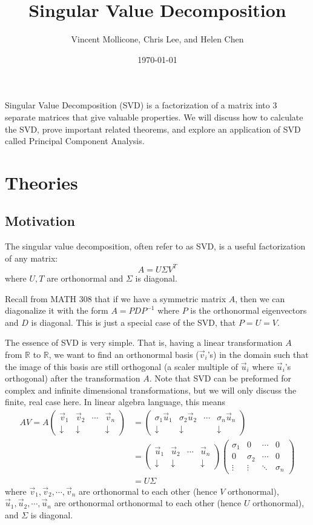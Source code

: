 \documentclass{article}
\title{Singular Value Decomposition}
\author{Vincent Mollicone, Chris Lee, and Helen Chen}
\date{\today}
\begin{document}
\maketitle
Singular Value Decomposition (SVD) is a factorization of a matrix into 3 separate matrices that give valuable properties. We will discuss how to calculate the SVD, prove important related theorems, and explore an application of SVD called Principal Component Analysis.
\tableofcontents
\newpage

\section{Theories}
\subsection{Motivation}
The singular value decomposition, often refer to as SVD, is a useful factorization of any matrix:
$$A = U \Sigma V^T$$
where $U,T$ are orthonormal and $\Sigma$ is diagonal.

Recall from MATH 308 that if we have a symmetric matrix $A$, then we can diagonalize it with the form $A=PDP^{-1}$ where $P$ is the orthonormal eigenvectors and $D$ is diagonal. This is just a special case of the SVD, that $P = U = V$.

The essence of SVD is very simple. That is, having a linear transformation $A$ from $\mathbb{R}$ to $\mathbb{R}$, we want to find an orthonormal basis ($\vec{v}_i$'s) in the domain such that the image of this basis are still orthogonal (a scaler multiple of $\vec{u}_i$ where $\vec{u}_i$'s orthogonal) after the transformation $A$. Note that SVD can be preformed for complex and infinite dimensional transformations, but we will only discuss the finite, real case here. In linear algebra language, this means 
\begin{align*}
AV =A \begin{pmatrix} \vec{v}_1 & \vec{v}_2 & \cdots & \vec{v}_n  \\ \downarrow & \downarrow & &\downarrow \end{pmatrix} &= \begin{pmatrix} \sigma_1 \vec{u}_1 & \sigma_2 \vec{u}_2 & \cdots &\sigma_n \vec{u}_n  \\ \downarrow & \downarrow & &\downarrow \end{pmatrix} \\
&= \begin{pmatrix} \vec{u}_1 & \vec{u}_2 & \cdots & \vec{u}_n  \\ \downarrow & \downarrow & &\downarrow \end{pmatrix} \begin{pmatrix} \sigma_1 & 0 & \cdots & 0 \\ 0& \sigma_2 & \cdots & 0 \\ \vdots & \vdots & \ddots & \sigma_n \end{pmatrix} \\
&= U \Sigma
\end{align*}
where $\vec{v}_1, \vec{v}_2, \cdots, \vec{v}_n$ are orthonormal to each other (hence $V$ orthonormal), $\vec{u}_1, \vec{u}_2, \cdots, \vec{u}_n$ are orthonormal orthonormal to each other (hence $U$ orthonormal), and $\Sigma$ is diagonal.
\end{document}
